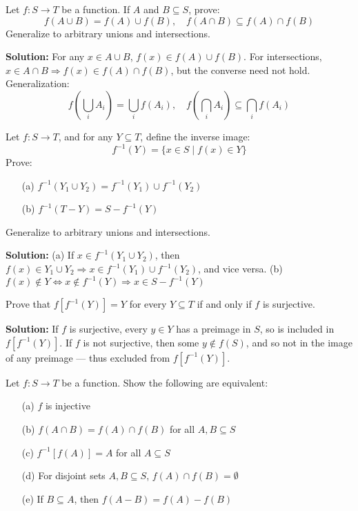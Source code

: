 \begin{problembox}
Let \( f: S \to T \) be a function. If \( A \) and \( B \subseteq S \), prove:
\[
f(A \cup B) = f(A) \cup f(B), \quad f(A \cap B) \subseteq f(A) \cap f(B)
\]
Generalize to arbitrary unions and intersections.
\end{problembox}

\textbf{Solution:}  
For any \( x \in A \cup B \), \( f(x) \in f(A) \cup f(B) \).  
For intersections, \( x \in A \cap B \Rightarrow f(x) \in f(A) \cap f(B) \), but the converse need not hold.  
Generalization:  
\[
f\left( \bigcup_i A_i \right) = \bigcup_i f(A_i), \quad f\left( \bigcap_i A_i \right) \subseteq \bigcap_i f(A_i)
\]

\begin{problembox}
Let \( f: S \to T \), and for any \( Y \subseteq T \), define the inverse image:
\[
f^{-1}(Y) = \{x \in S \mid f(x) \in Y \}
\]
Prove:
\begin{itemize}
\item[(a)] \( f^{-1}(Y_1 \cup Y_2) = f^{-1}(Y_1) \cup f^{-1}(Y_2) \)
\item[(b)] \( f^{-1}(T - Y) = S - f^{-1}(Y) \)
\end{itemize}
Generalize to arbitrary unions and intersections.
\end{problembox}

\textbf{Solution:}  
(a) If \( x \in f^{-1}(Y_1 \cup Y_2) \), then \( f(x) \in Y_1 \cup Y_2 \Rightarrow x \in f^{-1}(Y_1) \cup f^{-1}(Y_2) \), and vice versa.  
(b) \( f(x) \notin Y \iff x \notin f^{-1}(Y) \Rightarrow x \in S - f^{-1}(Y) \)

\begin{problembox}
Prove that \( f[f^{-1}(Y)] = Y \) for every \( Y \subseteq T \) if and only if \( f \) is surjective.
\end{problembox}

\textbf{Solution:}  
If \( f \) is surjective, every \( y \in Y \) has a preimage in \( S \), so is included in \( f[f^{-1}(Y)] \).  
If \( f \) is not surjective, then some \( y \notin f(S) \), and so not in the image of any preimage — thus excluded from \( f[f^{-1}(Y)] \).

\begin{problembox}
Let \( f: S \to T \) be a function. Show the following are equivalent:
\begin{itemize}
\item[(a)] \( f \) is injective
\item[(b)] \( f(A \cap B) = f(A) \cap f(B) \) for all \( A, B \subseteq S \)
\item[(c)] \( f^{-1}[f(A)] = A \) for all \( A \subseteq S \)
\item[(d)] For disjoint sets \( A, B \subseteq S \), \( f(A) \cap f(B) = \emptyset \)
\item[(e)] If \( B \subseteq A \), then \( f(A - B) = f(A) - f(B) \)
\end{itemize}
\end{problembox}

